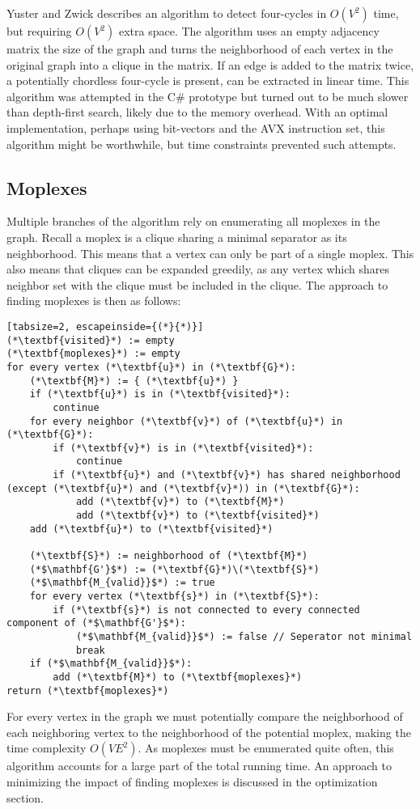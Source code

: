 \documentclass{article}
\begin{document}
		Yuster and Zwick\cite{finding-even-cycles} describes an algorithm to detect four-cycles in $O(V^2)$ time, but requiring $O(V^2)$ extra space.
		The algorithm uses an empty adjacency matrix the size of the graph and turns the neighborhood of each vertex in the original graph into a clique in the matrix.
		If an edge is added to the matrix twice, a potentially chordless four-cycle is present, can be extracted in linear time.
		This algorithm was attempted in the C\# prototype but turned out to be much slower than depth-first search, likely due to the memory overhead.
		With an optimal implementation, perhaps using bit-vectors and the AVX instruction set, this algorithm might be worthwhile, but time constraints prevented such attempts.

		\subsection{Moplexes}
		Multiple branches of the algorithm rely on enumerating all moplexes in the graph.
		Recall a moplex is a clique sharing a minimal separator as its neighborhood.
		This means that a vertex can only be part of a single moplex.
		This also means that cliques can be expanded greedily, as any vertex which shares neighbor set with the clique must be included in the clique.
		The approach to finding moplexes is then as follows:
		\begin{lstlisting}[tabsize=2, escapeinside={(*}{*)}]
(*\textbf{visited}*) := empty
(*\textbf{moplexes}*) := empty
for every vertex (*\textbf{u}*) in (*\textbf{G}*):
	(*\textbf{M}*) := { (*\textbf{u}*) }
	if (*\textbf{u}*) is in (*\textbf{visited}*):
		continue
	for every neighbor (*\textbf{v}*) of (*\textbf{u}*) in (*\textbf{G}*):
		if (*\textbf{v}*) is in (*\textbf{visited}*):
			continue
		if (*\textbf{u}*) and (*\textbf{v}*) has shared neighborhood (except (*\textbf{u}*) and (*\textbf{v}*)) in (*\textbf{G}*):
			add (*\textbf{v}*) to (*\textbf{M}*)
			add (*\textbf{v}*) to (*\textbf{visited}*)
	add (*\textbf{u}*) to (*\textbf{visited}*)

	(*\textbf{S}*) := neighborhood of (*\textbf{M}*)
	(*$\mathbf{G'}$*) := (*\textbf{G}*)\(*\textbf{S}*)
	(*$\mathbf{M_{valid}}$*) := true
	for every vertex (*\textbf{s}*) in (*\textbf{S}*):
		if (*\textbf{s}*) is not connected to every connected component of (*$\mathbf{G'}$*):
			(*$\mathbf{M_{valid}}$*) := false // Seperator not minimal
			break
	if (*$\mathbf{M_{valid}}$*):
		add (*\textbf{M}*) to (*\textbf{moplexes}*)
return (*\textbf{moplexes}*)
		\end{lstlisting}
		For every vertex in the graph we must potentially compare the neighborhood of each neighboring vertex to the neighborhood of the potential moplex, making the time complexity $O(VE^2)$.
		As moplexes must be enumerated quite often, this algorithm accounts for a large part of the total running time.
		An approach to minimizing the impact of finding moplexes is discussed in the optimization section.
\end{document}
